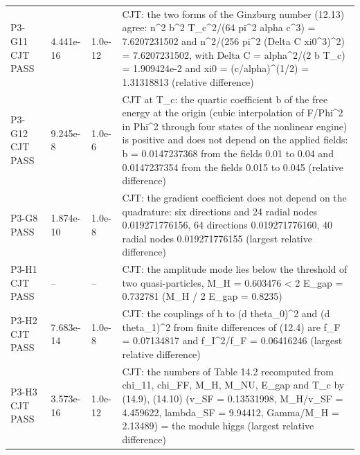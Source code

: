 \documentclass[aps,prd,onecolumn,superscriptaddress,nofootinbib,floatfix,longbibliography]{revtex4-2}
\begin{document}
\begin{longtable}{p{}p{}p{}p{}}
P3-G11 CJT \newline PASS & 4.441e-16 & 1.0e-12 & CJT: the two forms of the Ginzburg number (12.13) agree: n\textasciicircum{}2 b\textasciicircum{}2 T\_c\textasciicircum{}2/(64 pi\textasciicircum{}2 alpha c\textasciicircum{}3) = 7.6207231502 and n\textasciicircum{}2/(256 pi\textasciicircum{}2 (Delta C xi0\textasciicircum{}3)\textasciicircum{}2) = 7.6207231502, with Delta C = alpha\textasciicircum{}2/(2 b T\_c) = 1.909424e-2 and xi0 = (c/alpha)\textasciicircum{}(1/2) = 1.31318813 (relative difference) \\
P3-G12 CJT \newline PASS & 9.245e-8 & 1.0e-6 & CJT at T\_c: the quartic coefficient b of the free energy at the origin (cubic interpolation of F/Phi\textasciicircum{}2 in Phi\textasciicircum{}2 through four states of the nonlinear engine) is positive and does not depend on the applied fields: b = 0.0147237368 from the fields 0.01 to 0.04 and 0.0147237354 from the fields 0.015 to 0.045 (relative difference) \\
P3-G8 \newline PASS & 1.874e-10 & 1.0e-8 & CJT: the gradient coefficient does not depend on the quadrature: six directions and 24 radial nodes 0.019271776156, 64 directions 0.019271776160, 40 radial nodes 0.019271776155 (largest relative difference) \\
P3-H1 CJT \newline PASS & -- & -- & CJT: the amplitude mode lies below the threshold of two quasi-particles, M\_H = 0.603476 \textless{} 2 E\_gap = 0.732781 (M\_H / 2 E\_gap = 0.8235) \\
P3-H2 CJT \newline PASS & 7.683e-14 & 1.0e-8 & CJT: the couplings of h to (d theta\_0)\textasciicircum{}2 and (d theta\_1)\textasciicircum{}2 from finite differences of (12.4) are f\_F = 0.07134817 and f\_I\textasciicircum{}2/f\_F = 0.06416246 (largest relative difference) \\
P3-H3 CJT \newline PASS & 3.573e-16 & 1.0e-12 & CJT: the numbers of Table 14.2 recomputed from chi\_11, chi\_FF, M\_H, M\_NU, E\_gap and T\_c by (14.9), (14.10) (v\_SF = 0.13531998, M\_H/v\_SF = 4.459622, lambda\_SF = 9.94412, Gamma/M\_H = 2.13489) = the module higgs (largest relative difference) \\
\end{longtable}
\endgroup
\end{document}
